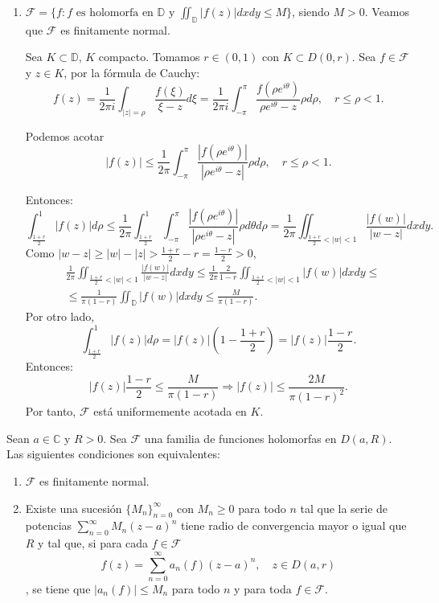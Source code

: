 \begin{example}
\begin{enumerate}
        \item $\mathcal{F} = \{f : f \text{ es holomorfa en } \mathbb{D} \text{ y } \iint_\mathbb{D} |f(z)|dxdy \leq M\}$, siendo $M > 0$.
              Veamos que $\mathcal{F}$ es finitamente normal.

              Sea $K \subset \mathbb{D}$, $K$ compacto.
              Tomamos $r \in (0, 1)$ con $K \subset D(0, r)$.
              Sea $f \in \mathcal{F}$ y $z \in K$, por la fórmula de Cauchy:
              $$f(z) = \frac{1}{2\pi i} \int_{|z| = \rho} \frac{f(\xi)}{\xi-z}d\xi = \frac{1}{2\pi i} \int_{-\pi}^\pi \frac{f(\rho e^{i\theta})}{\rho e^{i\theta} - z}\rho d\rho, \quad r \leq \rho < 1.$$

              Podemos acotar
              $$|f(z)| \leq \frac{1}{2\pi} \int_{-\pi}^\pi \frac{|f(\rho e^{i\theta})|}{|\rho e^{i\theta} - z|}\rho d\rho, \quad r \leq \rho < 1.$$

              Entonces:
              $$\int_{\frac{1+r}{2}}^1 |f(z)|d\rho \leq \frac{1}{2\pi} \int_{\frac{1+r}{2}}^1 \int_{-\pi}^\pi \frac{|f(\rho e^{i\theta})|}{|\rho e^{i\theta} - z|}\rho d\theta d\rho = \frac{1}{2\pi} \iint_{\frac{1+r}{2} < |w| < 1} \frac{|f(w)|}{|w-z|}dxdy.$$
              Como $|w-z| \geq |w| - |z| > \frac{1+r}{2}-r = \frac{1-r}{2} > 0$,
              \begin{align*}
                   & \frac{1}{2\pi} \iint_{\frac{1+r}{2} < |w| < 1} \frac{|f(w)|}{|w-z|}dxdy \leq \frac{1}{2\pi} \frac{2}{1-r} \iint_{\frac{1+r}{2} < |w| < 1} |f(w)| dxdy \leq \\
                   & \leq \frac{1}{\pi(1-r)} \iint_\mathbb{D} |f(w)|dxdy \leq \frac{M}{\pi(1-r)}.
              \end{align*}
              Por otro lado,
              $$\int_{\frac{1+r}{2}}^1 |f(z)|d\rho = |f(z)|\left(1 - \frac{1+r}{2}\right) = |f(z)|\frac{1-r}{2}.$$
              Entonces:
              $$|f(z)|\frac{1-r}{2} \leq \frac{M}{\pi(1-r)} \Rightarrow |f(z)| \leq \frac{2M}{\pi(1-r)^2}.$$
              Por tanto, $\mathcal{F}$ está uniformemente acotada en $K$.
    \end{enumerate}
\end{example}

\begin{theorem}
    Sean $a \in \mathbb{C}$ y $R > 0$.
    Sea $\mathcal{F}$ una familia de funciones holomorfas en $D(a, R)$.
    Las siguientes condiciones son equivalentes:
    \begin{enumerate}
        \item $\mathcal{F}$ es finitamente normal.
        \item Existe una sucesión $\{M_n\}_{n=0}^\infty$ con $M_n \geq 0$ para todo $n$ tal que la serie de potencias $\sum_{n=0}^\infty M_n(z-a)^n$ tiene radio de convergencia mayor o igual que $R$ y tal que, si para cada $f \in \mathcal{F}$
              $$f(z) = \sum_{n=0}^\infty a_n(f)(z-a)^n, \quad z \in D(a, r)$$,
              se tiene que $|a_n(f)| \leq M_n$ para todo $n$ y para toda $f \in \mathcal{F}$.
    \end{enumerate}
\end{theorem}

